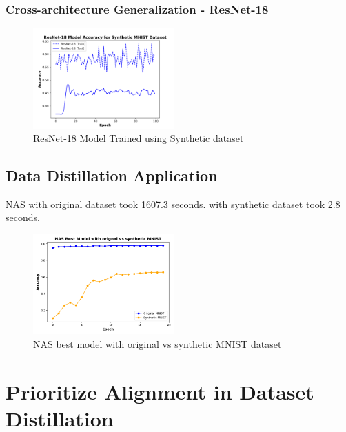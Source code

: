 \documentclass[conference, compsoc]{IEEEtran}
\begin{document}
\subsubsection{Cross-architecture Generalization - ResNet-18}
\begin{figure}[H]
	\centering
	\includegraphics[width=0.48\textwidth]{mhist_resnet_acc.png}
	\caption{ResNet-18 Model Trained using Synthetic dataset}
	\label{fig:mhist_resnet_acc}
\end{figure}

\subsection{Data Distillation Application}
NAS with original dataset took 1607.3 seconds.
with synthetic dataset took 2.8 seconds.

\begin{figure}[H]
	\centering
	\includegraphics[width=0.48\textwidth]{nas_comparision.png}
	\caption{NAS best model with original vs synthetic MNIST dataset}
	\label{fig:nas_comparision}
\end{figure}

\section{Prioritize Alignment in Dataset Distillation}
\end{document}

